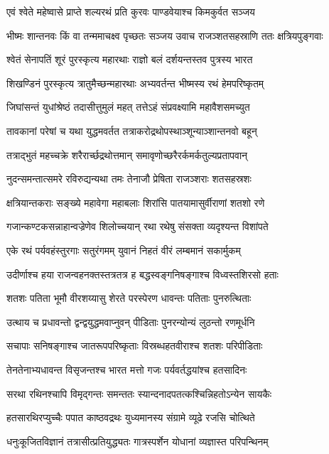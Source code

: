 \twolineshloka
{एवं श्वेते महेष्वासे प्राप्ते शल्यरथं प्रति}
{कुरवः पाण्डवेयाश्च किमकुर्वत सञ्जय}


\threelineshloka
{भीष्मः शान्तनवः किं वा तन्ममाचक्ष्व पृच्छतः}
{सञ्जय उवाच}
{राजञ्शतसहस्राणि ततः क्षत्रियपुङ्गवाः}


\twolineshloka
{श्वेतं सेनापतिं शूरं पुरस्कृत्य महारथाः}
{राज्ञो बलं दर्शयन्तस्तव पुत्रस्य भारत}


\twolineshloka
{शिखण्डिनं पुरस्कृत्य त्रातुमैच्छन्महारथाः}
{अभ्यवर्तन्त भीष्मस्य रथं हेमपरिष्कृतम्}


\twolineshloka
{जिघांसन्तं युधांश्रेष्ठं तदासीत्तुमुलं महत्}
{तत्तेऽहं संप्रवक्ष्यामि महावैशसमच्युत}


\twolineshloka
{तावकानां परेषां च यथा युद्धमवर्तत}
{तत्राकरोद्रथोपस्थाञ्शून्याञ्शान्तनवो बहून्}


\twolineshloka
{तत्राद्भुतं महच्चक्रे शरैरार्च्छद्रथोत्तमान्}
{समावृणोच्छरैरर्कमर्कतुल्यप्रतापवान्}


\twolineshloka
{नुदन्समन्तात्समरे रविरुद्यन्यथा तमः}
{तेनाजौ प्रेषिता राजञ्शराः शतसहस्रशः}


\twolineshloka
{क्षत्रियान्तकराः सङ्ख्ये महावेगा महाबलाः}
{शिरांसि पातयामासुर्वीराणां शतशो रणे}


\twolineshloka
{गजान्कण्टकसन्नाहान्वज्रेणेव शिलोच्चयान्}
{रथा रथेषु संसक्ता व्यदृश्यन्त विशांपते}


\twolineshloka
{एके रथं पर्यवहंस्तुरगाः सतुरंगमम्}
{युवानं निहतं वीरं लम्बमानं सकार्मुकम्}


\twolineshloka
{उदीर्णाश्च हया राजन्वहनक्तस्तत्रतत्र ह}
{बद्धस्वङ्गनिषङ्गाश्च विध्वस्तशिरसो हताः}


\twolineshloka
{शतशः पतिता भूमौ वीरशय्यासु शेरते}
{परस्पेरण धावन्तः पतिताः पुनरुत्थिताः}


\twolineshloka
{उत्थाय च प्रधावन्तो द्वन्द्वयुद्धमवाप्नुवन्}
{पीडिताः पुनरन्योन्यं लुठन्तो रणमूर्धनि}


\twolineshloka
{सचापाः सनिषङ्गाश्च जातरूपपरिष्कृताः}
{विस्रब्धहतवीराश्च शतशः परिपीडिताः}


\twolineshloka
{तेनतेनाभ्यधावन्त विसृजन्तश्च भारत}
{मत्तो गजः पर्यवर्तद्धयांश्च हतसादिनः}


\twolineshloka
{सरथा रथिनश्चापि विमृद्गन्तः समन्ततः}
{स्यान्दनादपतत्कश्चिन्निहतोऽन्येन सायकैः}


\twolineshloka
{हतसारथिरप्युच्चैः पपात काष्ठवद्रथः}
{युध्यमानस्य संग्रामे व्यूढे रजसि चोत्थिते}


\twolineshloka
{धनुःकूजितविज्ञानं तत्रासीत्प्रतियुद्ध्यतः}
{गात्रस्पर्शेन योधानां व्यज्ञास्त परिपन्थिनम्}


